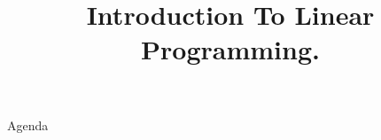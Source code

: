 \documentclass[../slides.tex]{subfiles}
\title{Introduction To Linear Programming.}
\begin{document}
\begin{frame}
  \maketitle
\end{frame}


     \begin{frame}{Agenda}
   \tableofcontents
 \end{frame}





\begin{frame}
  \maketitle
\end{frame}
\end{document}
